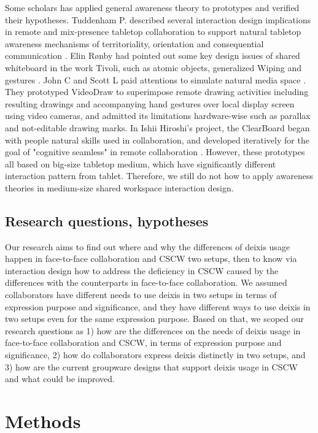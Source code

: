 \documentclass[12pt,twoside]{article}
\begin{document}
Some scholars has applied general awareness theory to prototypes and verified their hypotheses. Tuddenham P. described several interaction design implications in remote and mix-presence tabletop collaboration to support natural tabletop awareness mechanisms of territoriality, orientation and consequential communication \cite{robinson2007distributed}. Elin Rønby had pointed out some key design issues of shared whiteboard in the work Tivoli, such as atomic objects, generalized Wiping and gestures \cite{pedersen1993tivoli}. John C and Scott L paid attentions to simulate natural media space \cite{tang1991videodraw}. They prototyped VideoDraw to superimpose remote drawing activities including resulting drawings and accompanying hand gestures over local display screen using video cameras, and admitted its limitations hardware-wise such as parallax and not-editable drawing marks. In Ishii Hiroshi's project, the ClearBoard began with people natural skills used in collaboration, and developed iteratively for the goal of "cognitive seamless" in remote collaboration \cite{ishii1992clearboard}\cite{ishii1994iterative}. However, these prototypes all based on big-size tabletop medium, which have significantly different interaction pattern from tablet. Therefore, we still do not how to apply awareness theories in medium-size shared workspace interaction design.

\subsection{Research questions, hypotheses}
\label{sect:questions}

Our research aims to find out where and why the differences of deixis usage happen in face-to-face collaboration and CSCW two setups, then to know via interaction design how to address the deficiency in CSCW caused by the differences with the counterparts in face-to-face collaboration. We assumed collaborators have different needs to use deixis in two setups in terms of expression purpose and significance, and they have different ways to use deixis in two setups even for the same expression purpose. Based on that, we scoped our research questions as 1) how are the differences on the needs of deixis usage in face-to-face collaboration and CSCW, in terms of expression purpose and significance, 2) how do collaborators express deixis distinctly in two setups, and 3) how are the current groupware designs that support deixis usage in CSCW and what could be improved. 


\section{Methods}
\label{sec:method}
\end{document}
